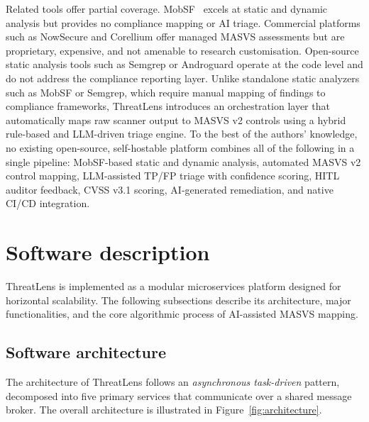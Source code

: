 \documentclass[preprint,12pt,a4paper]{elsarticle}
\begin{document}
Related tools offer partial coverage. MobSF~\cite{mobsf} excels at static and dynamic
analysis but provides no compliance mapping or AI triage. Commercial platforms such as
NowSecure and Corellium offer managed MASVS assessments but are proprietary, expensive,
and not amenable to research customisation. Open-source static analysis tools such as
Semgrep or Androguard operate at the code level and do not address the compliance
reporting layer. Unlike standalone static analyzers such as MobSF or Semgrep, which require manual mapping of findings to compliance frameworks, ThreatLens introduces an orchestration layer that automatically maps raw scanner output to MASVS v2 controls using a hybrid rule-based and LLM-driven triage engine. To the best of the authors' knowledge, no existing open-source, self-hostable platform combines all of the following in a single pipeline: MobSF-based static and dynamic analysis, automated MASVS v2 control mapping, LLM-assisted TP/FP triage with confidence scoring, HITL auditor feedback, CVSS v3.1 scoring, AI-generated remediation, and native CI/CD integration.

\section{Software description}

ThreatLens is implemented as a modular microservices platform designed for horizontal
scalability. The following subsections describe its architecture, major functionalities, and
the core algorithmic process of AI-assisted MASVS mapping.

\subsection{Software architecture}

The architecture of ThreatLens follows an \emph{asynchronous task-driven} pattern,
decomposed into five primary services that communicate over a shared message broker. The overall architecture is illustrated in Figure~\ref{fig:architecture}.
\end{document}
